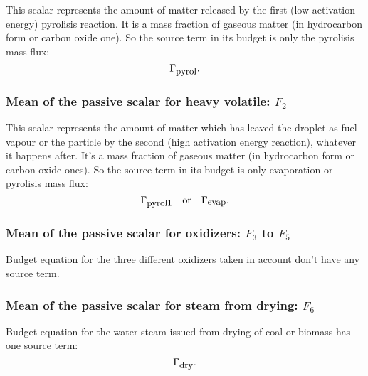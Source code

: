 This scalar represents the amount of matter released by the first (low
activation energy) pyrolisis reaction. It is a mass fraction of gaseous matter
(in hydrocarbon form or carbon oxide one). So the source term in its budget is
only the pyrolisis mass flux:
\begin{equation}
    \Gamma _{\mbox{\small pyrol}}.
\end{equation}
\subsubsection{Mean of the passive scalar for heavy volatile: $F_{2}$}

This scalar represents the amount of matter which has leaved the droplet as fuel
vapour or the particle by the second (high activation energy reaction), whatever
it happens after. It's a mass fraction of gaseous matter (in hydrocarbon form or
carbon oxide ones). So the source term in its budget is only evaporation or
pyrolisis mass flux:
\begin{equation}
    \Gamma_{\mbox{\small pyrol1}} \quad \text{or} \quad \Gamma_{\mbox{\small evap}}.
\end{equation}

\subsubsection{Mean of the passive scalar for oxidizers: $F_{3}$ to $F_{5}$}

Budget equation for the three different oxidizers taken in account don't have
any source term.
\subsubsection{Mean of the passive scalar for steam from drying: $F_{6}$}

Budget equation for the water steam issued from drying of coal or biomass has
one source term:
\begin{equation}
    \Gamma_{\mbox{\small dry}}.
\end{equation}


